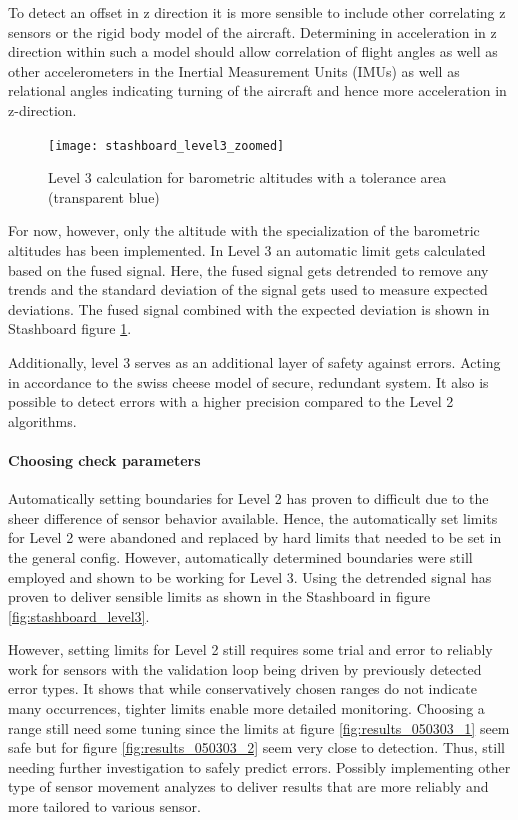 To detect an offset in z direction it is more sensible to include other correlating z sensors or the rigid body model of the aircraft. Determining in acceleration in z direction within such a model should allow correlation of flight angles as well as other accelerometers in the Inertial Measurement Units (IMUs) as well as relational angles indicating turning of the aircraft and hence more acceleration in z-direction.
\begin{figure}
    \centering
    \texttt{[image: stashboard\_level3\_zoomed]}
    \caption{Level 3 calculation for barometric altitudes with a tolerance area (transparent blue)}
    \label{fig:stashboard_level3_zoomed}
\end{figure}

For now, however, only the altitude with the specialization of the barometric altitudes has been implemented. In Level 3 an automatic limit gets calculated based on the fused signal. Here, the fused signal gets detrended to remove any trends and the standard deviation of the signal gets used to measure expected deviations. The fused signal combined with the expected deviation is shown in Stashboard figure \ref{fig:stashboard_level3_zoomed}.

Additionally, level 3 serves as an additional layer of safety against errors. Acting in accordance to the swiss cheese model of secure, redundant system. It also is possible to detect errors with a higher precision compared to the Level 2 algorithms.




\paragraph{Choosing check parameters}

Automatically setting boundaries for Level 2 has proven to difficult due to the sheer difference of sensor behavior available. Hence, the automatically set limits for Level 2 were abandoned and replaced by hard limits that needed to be set in the general config. However, automatically determined boundaries were still employed and shown to be working for Level 3. Using the detrended signal has proven to deliver sensible limits as shown in the Stashboard in figure \ref{fig:stashboard_level3}.

However, setting limits for Level 2 still requires some trial and error to reliably work for sensors with the validation loop being driven by previously detected error types. It shows that while conservatively chosen ranges do not indicate many occurrences, tighter limits enable more detailed monitoring. Choosing a range still need some tuning since the limits at figure \ref{fig:results_050303_1} seem safe but for figure \ref{fig:results_050303_2} seem very close to detection. Thus, still needing further investigation to safely predict errors. Possibly implementing other type of sensor movement analyzes to deliver results that are more reliably and more tailored to various sensor.

